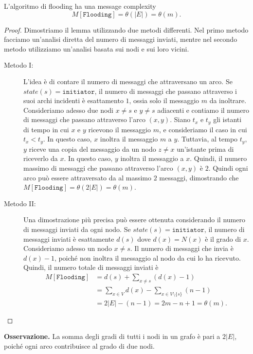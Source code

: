 \begin{lemma}
    L'algoritmo di flooding ha una message complexity 
    \[
        M[\texttt{Flooding}] = \theta(|E|) = \theta(m).
    \]
    \begin{proof}
        Dimostriamo il lemma utilizzando due metodi differenti. Nel primo metodo facciamo un'analisi diretta del numero di messaggi inviati, mentre nel secondo metodo utilizziamo un'analisi basata sui nodi e sui loro vicini.
        \begin{description}
            \item[Metodo I: ] L'idea è di contare il numero di messaggi che attraversano un arco. Se $state(s) = \texttt{initiator}$, il numero di messaggi che passano attraverso i suoi archi incidenti è esattamento $1$, ossia solo il messaggio $m$ da inoltrare. Consideriamo adesso due nodi $x \neq s$ e $y \neq s$ adiacenti e contiamo il numero di messaggi che passano attraverso l'arco $(x, y)$. Siano $t_x$ e $t_y$ gli istanti di tempo in cui $x$ e $y$ ricevono il messaggio $m$, e consideriamo il caso in cui $t_x < t_y$. In questo caso, $x$ inoltra il messaggio $m$ a $y$. Tuttavia, al tempo $t_y$, $y$ riceve una copia del messaggio da un nodo $z \neq x$ un'istante prima di riceverlo da $x$. In questo caso, $y$ inoltra il messaggio a $x$. Quindi, il numero massimo di messaggi che passano attraverso l'arco $(x, y)$ è $2$. Quindi ogni arco può essere attraversato da al massimo $2$ messaggi, dimostrando che $M[\texttt{Flooding}] = \theta(2|E|) = \theta(m)$.
            \item[Metodo II: ] Una dimostrazione più precisa può essere ottenuta considerando il numero di messaggi inviati da ogni nodo. Se $state(s) = \texttt{initiator}$, il numero di messaggi inviati è esattamente $d(s)$ dove $d(x) = N(x)$ è il grado di $x$. Consideriamo adesso un nodo $x \neq s$. Il numero di messaggi che invia è $d(x) - 1$, poiché non inoltra il messaggio al nodo da cui lo ha ricevuto. Quindi, il numero totale di messaggi inviati è
            \begin{align*}
                M[\texttt{Flooding}] &= d(s) + \sum_{x \neq s} (d(x) - 1) \\ 
                &= \sum_{x \in V} d(x) - \sum_{x \in V \setminus \{s\}} (n - 1) \\
                &= 2|E| - (n - 1) = 2m - n + 1 = \theta(m).
            \end{align*}
        \end{description}
    \end{proof}
    \textbf{Osservazione.} La somma degli gradi di tutti i nodi in un grafo è pari a $2|E|$, poiché ogni arco contribuisce al grado di due nodi.
\end{lemma}

